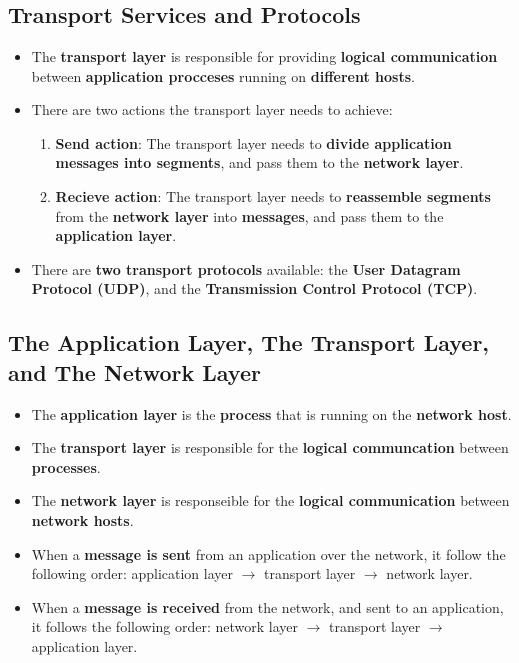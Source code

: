 \documentclass[16pt]{article}
\begin{document}
    \section*{}

    \subsection*{Transport Services and Protocols}
    \begin{itemize}
        \item The \textbf{transport layer} is responsible for providing \textbf{logical communication} between \textbf{application procceses} running on \textbf{different hosts}.
        \item There are two actions the transport layer needs to achieve:
        \begin{enumerate}
            \item \textbf{Send action}: The transport layer needs to \textbf{divide application messages into segments}, and pass them to the \textbf{network layer}.
            \item \textbf{Recieve action}: The transport layer needs to \textbf{reassemble segments} from the \textbf{network layer} into \textbf{messages}, and pass them to the \textbf{application layer}.
        \end{enumerate}
        \item There are \textbf{two transport protocols} available: the \textbf{User Datagram Protocol (UDP)}, and the \textbf{Transmission Control Protocol (TCP)}.
    \end{itemize}

    \subsection*{The Application Layer, The Transport Layer, and The Network Layer}
    \begin{itemize}
        \item The \textbf{application layer} is the \textbf{process} that is running on the \textbf{network host}.
        \item The \textbf{transport layer} is responsible for the \textbf{logical communcation} between \textbf{processes}.
        \item The \textbf{network layer} is responseible for the \textbf{logical communication} between \textbf{network hosts}.
        \item When a \textbf{message is sent} from an application over the network, it follow the following order: application layer $\rightarrow$ transport layer $\rightarrow$ network layer.
        \item When a \textbf{message is received} from the network, and sent to an application, it follows the following order: network layer $\rightarrow$ transport layer $\rightarrow$ application layer.
    \end{itemize}
\end{document}
